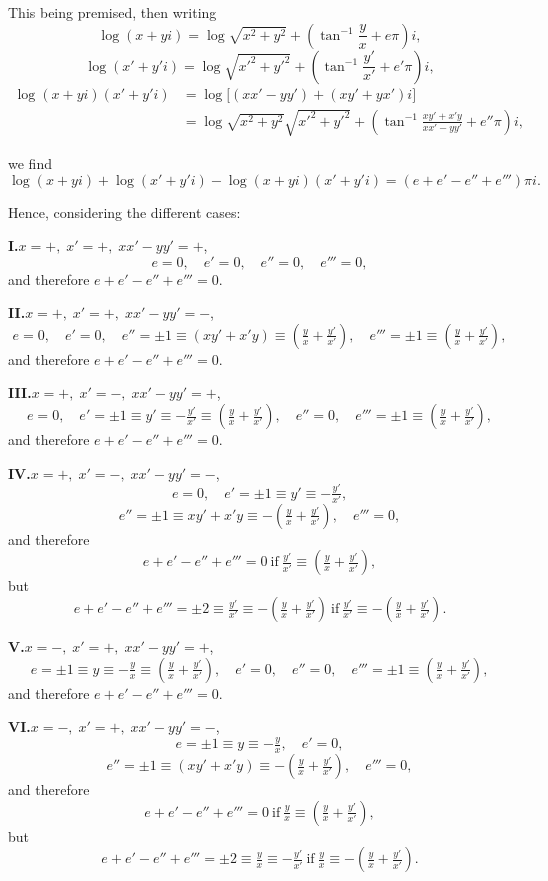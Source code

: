 \documentclass[11pt]{article}
\begin{document}
This being premised, then writing
\[
\log(x+yi)=\log\sqrt{x^{2}+y^{2}}+\left(\tan^{-1}\frac{y}{x}+e\pi\right)i,
\]
\[
\log(x'+y'i)=\log\sqrt{x'^{2}+y'^{2}}+\left(\tan^{-1}\frac{y'}{x'}+e'\pi\right)i,
\]
\[
\begin{aligned}
\log(x+yi)(x'+y'i) &= \log\bigl[(xx'-yy')+(xy'+yx')i\bigr]\\
&= \log\sqrt{x^{2}+y^{2}}\sqrt{x'^{2}+y'^{2}}+\left(\tan^{-1}\frac{xy'+x'y}{xx'-yy'}+e''\pi\right)i,
\end{aligned}
\]

\clearpage

we find
\[
\log(x+yi)+\log(x'+y'i)-\log(x+yi)(x'+y'i)=(e+e'-e''+e''')\pi i.
\]

Hence, considering the different cases:

\medskip
\noindent\textbf{I.}\quad $x=+,\;x'=+,\;xx'-yy'=+$,
\[
e=0,\quad e'=0,\quad e''=0,\quad e'''=0,
\]
and therefore $e+e'-e''+e'''=0$.

\medskip
\noindent\textbf{II.}\quad $x=+,\;x'=+,\;xx'-yy'=-$,
\[
e=0,\quad e'=0,\quad e''=\pm 1\equiv (xy'+x'y)\equiv\left(\tfrac{y}{x}+\tfrac{y'}{x'}\right),\quad e'''=\pm 1\equiv\left(\tfrac{y}{x}+\tfrac{y'}{x'}\right),
\]
and therefore $e+e'-e''+e'''=0$.

\medskip
\noindent\textbf{III.}\quad $x=+,\;x'=-,\;xx'-yy'=+$,
\[
e=0,\quad e'=\pm 1\equiv y'\equiv -\tfrac{y'}{x'}\equiv\left(\tfrac{y}{x}+\tfrac{y'}{x'}\right),\quad e''=0,\quad e'''=\pm 1\equiv\left(\tfrac{y}{x}+\tfrac{y'}{x'}\right),
\]
and therefore $e+e'-e''+e'''=0$.

\medskip
\noindent\textbf{IV.}\quad $x=+,\;x'=-,\;xx'-yy'=-$,
\[
e=0,\quad e'=\pm 1\equiv y'\equiv-\tfrac{y'}{x'},
\]
\[
e''=\pm 1\equiv xy'+x'y\equiv-\left(\tfrac{y}{x}+\tfrac{y'}{x'}\right),\quad e'''=0,
\]
and therefore
\[
e+e'-e''+e'''=0\ \text{if}\ \tfrac{y'}{x'}\equiv\left(\tfrac{y}{x}+\tfrac{y'}{x'}\right),
\]
but
\[
e+e'-e''+e'''=\pm 2\equiv\tfrac{y'}{x'}\equiv-\left(\tfrac{y}{x}+\tfrac{y'}{x'}\right)\ \text{if}\ \tfrac{y'}{x'}\equiv-\left(\tfrac{y}{x}+\tfrac{y'}{x'}\right).
\]

\medskip
\noindent\textbf{V.}\quad $x=-,\;x'=+,\;xx'-yy'=+$,
\[
e=\pm 1\equiv y\equiv-\tfrac{y}{x}\equiv\left(\tfrac{y}{x}+\tfrac{y'}{x'}\right),\quad e'=0,\quad e''=0,\quad e'''=\pm 1\equiv\left(\tfrac{y}{x}+\tfrac{y'}{x'}\right),
\]
and therefore $e+e'-e''+e'''=0$.

\medskip
\noindent\textbf{VI.}\quad $x=-,\;x'=+,\;xx'-yy'=-$,
\[
e=\pm 1\equiv y\equiv-\tfrac{y}{x},\quad e'=0,
\]
\[
e''=\pm 1\equiv (xy'+x'y)\equiv-\left(\tfrac{y}{x}+\tfrac{y'}{x'}\right),\quad e'''=0,
\]
and therefore
\[
e+e'-e''+e'''=0\ \text{if}\ \tfrac{y}{x}\equiv\left(\tfrac{y}{x}+\tfrac{y'}{x'}\right),
\]
but
\[
e+e'-e''+e'''=\pm 2\equiv\tfrac{y}{x}\equiv-\tfrac{y'}{x'}\ \text{if}\ \tfrac{y}{x}\equiv-\left(\tfrac{y}{x}+\tfrac{y'}{x'}\right).
\]
\end{document}
